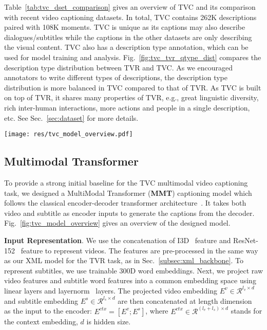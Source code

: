 \documentclass[runningheads]{llncs}
\begin{document}
Table~\ref{tab:tvc_dset_comparison} gives an overview of TVC and its comparison with recent video captioning datasets. 
In total, TVC contains 262K descriptions paired with 108K moments. 
TVC is unique as its captions may also describe dialogues/subtitles while the captions in the other datasets are only describing the visual content.
TVC also has a description type annotation, which can be used for model training and analysis.
Fig.~\ref{fig:tvc_tvr_qtype_dist} compares the description type distribution between TVR and TVC. 
As we encouraged annotators to write different types of descriptions, the description type distribution is more balanced in TVC compared to that of TVR. 
As TVC is built on top of TVR, it shares many properties of TVR, e.g., great linguistic diversity, rich inter-human interactions, more actions and people in a single description, etc. See Sec.~\ref{sec:dataset} for more details.




\begin{figure*}[!t]
  \centering
  \texttt{[image: res/tvc\_model\_overview.pdf]}
  \caption{Overview of the MultiModal Transformer (MMT) model for the TVC task. \textit{PE} stands for Positional Encoding}
  \label{fig:tvc_model_overview}
\end{figure*}




\subsection{Multimodal Transformer}
To provide a strong initial baseline for the TVC multimodal video captioning task, we designed a MultiModal Transformer (\textbf{MMT}) captioning model which follows the classical encoder-decoder transformer architecture~\cite{vaswani2017attention}. 
It takes both video and subtitle as encoder inputs to generate the captions from the decoder.
Fig.~\ref{fig:tvc_model_overview} gives an overview of the designed model.


\kern2mm
\noindent\textbf{Input Representation}.
We use the concatenation of I3D~\cite{carreira2017quo} feature and ResNet-152~\cite{he2016deep} feature to represent videos. The features are pre-processed in the same way as our XML model for the TVR task, as in Sec.~\ref{subsec:xml_backbone}.
To represent subtitles, we use trainable 300D word embeddings. 
Next, we project raw video features and subtitle word features into a common embedding space using linear layers and layernorm~\cite{ba2016layer} layers. 
The projected video embedding $E^v \in \mathcal{R}^{l_{v}\times d}$ and subtitle embedding $E^s \in \mathcal{R}^{l_{s}\times d}$ are then concatenated at length dimension~\cite{lei2020mart} as the input to the encoder: $E^{ctx} = [E^v; E^s]$, where $E^{ctx} \in \mathcal{R}^{(l_v+l_s) \times d}$ stands for the context embedding, $d$ is hidden size.
\end{document}
